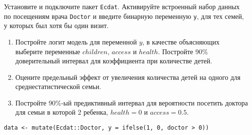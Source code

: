 \begin{problem}
Установите и подключите пакет \verb|Ecdat|. Активируйте встроенный набор данных по посещениям врача \verb|Doctor| и введите бинарную переменную \verb|y|, для тех семей, у которых был хотя бы один визит.


\begin{enumerate}
\item Постройте логит модель для переменной $y$, в качестве объясняющих выберите переменные $children$, $access$ и $health$. Постройте 90\% доверительный интервал для коэффициента при количестве детей.

\item Оцените предельный эффект от увеличения количества детей на одного для среднестатистической семьи.

\item Постройте 90\%-ый предиктивный интервал для вероятности посетить доктора для семьи в которой 2 ребенка, $health=0$ и $access=0.5$.
\end{enumerate}

\begin{sol}
\begin{verbatim}
data <- mutate(Ecdat::Doctor, y = ifelse(1, 0, doctor > 0))
\end{verbatim}

\end{sol}
\end{problem}


